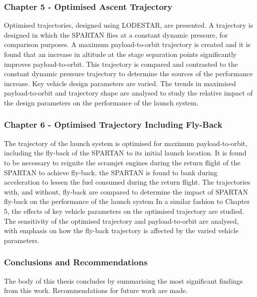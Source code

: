       \subsubsection*{Chapter 5 - Optimised Ascent Trajectory}
      
Optimised trajectories, designed using LODESTAR, are presented. A trajectory is designed in which the SPARTAN flies at a constant dynamic pressure, for comparison purposes. 
 A maximum payload-to-orbit trajectory is created and it is found that an increase in altitude at the stage separation points significantly improves payload-to-orbit.
 This trajectory is compared and contrasted to the constant dynamic pressure trajectory to determine the sources of the performance increase.  
 Key vehicle design parameters are varied. The trends in maximised payload-to-orbit and trajectory shape are analysed to study the relative impact of the design parameters on the performance of the launch system. 
 
 
      
      \subsubsection*{Chapter 6 - Optimised Trajectory Including Fly-Back}
      
      The trajectory of the launch system is optimised for maximum payload-to-orbit, including the fly-back of the SPARTAN to its initial launch location. 
      It is found to be necessary to reignite the scramjet engines during the return flight of the SPARTAN to achieve fly-back.
      the SPARTAN is found to bank during acceleration to lessen the fuel consumed during the return flight.
      The trajectories with, and without, fly-back are compared to determine the impact of SPARTAN fly-back on the performance of the launch system
      In a similar fashion to Chapter 5, the effects of key vehicle parameters on the optimised trajectory are studied. The sensitivity of the optimised trajectory and payload-to-orbit are analysed, with emphasis on how the fly-back trajectory is affected by the varied vehicle parameters.
      
     
      

    \subsubsection*{Conclusions and Recommendations}

      The body of this thesis concludes by summarising the most significant findings from this work. Recommendations for future work are made. 
      
